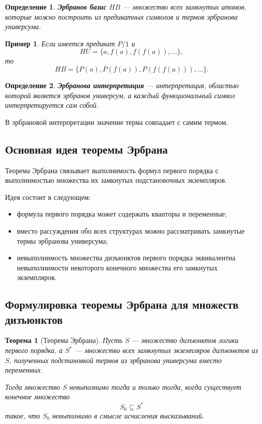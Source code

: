 \documentclass[12pt,a4paper]{article}
\newtheorem{definition}{Определение}
\newtheorem{theorem}{Теорема}
\newtheorem{example}{Пример}
\begin{document}
\begin{definition}
\textbf{Эрбранов базис} $HB$ --- множество всех замкнутых атомов, которые можно построить из предикатных символов и термов эрбранова универсума.
\end{definition}

\begin{example}
Если имеется предикат $P/1$ и
$$
HU=\{a,f(a),f(f(a)),\dots\},
$$
то
$$
HB =
\{P(a), P(f(a)), P(f(f(a))),\dots\}.
$$
\end{example}

\begin{definition}
\textbf{Эрбранова интерпретация} --- интерпретация, областью которой является эрбранов универсум, а каждый функциональный символ интерпретируется сам собой.
\end{definition}

В эрбрановой интерпретации значение терма совпадает с самим термом.

\subsection{Основная идея теоремы Эрбрана}

Теорема Эрбрана связывает выполнимость формул первого порядка с выполнимостью множества их замкнутых подстановочных экземпляров.

Идея состоит в следующем:
\begin{itemize}
    \item формула первого порядка может содержать кванторы и переменные;
    \item вместо рассуждения обо всех структурах можно рассматривать замкнутые термы эрбранова универсума;
    \item невыполнимость множества дизъюнктов первого порядка эквивалентна невыполнимости некоторого конечного множества его замкнутых экземпляров.
\end{itemize}

\subsection{Формулировка теоремы Эрбрана для множеств дизъюнктов}

\begin{theorem}[Теорема Эрбрана]
Пусть $S$ --- множество дизъюнктов логики первого порядка, а $S^*$ --- множество всех замкнутых экземпляров дизъюнктов из $S$, полученных подстановкой термов из эрбранова универсума вместо переменных.

Тогда множество $S$ невыполнимо тогда и только тогда, когда существует конечное множество
$$
S_0 \subseteq S^*
$$
такое, что $S_0$ невыполнимо в смысле исчисления высказываний.
\end{theorem}
\end{document}
